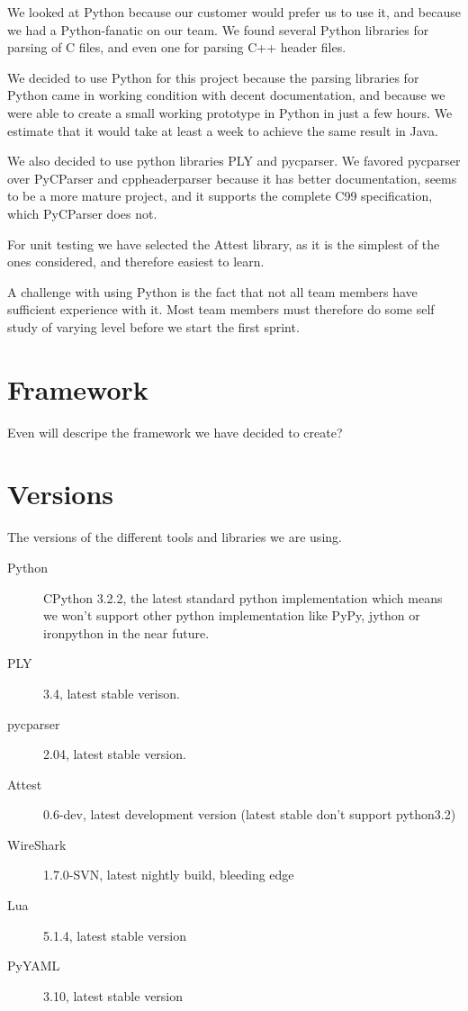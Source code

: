 We looked at Python because our customer would prefer us to use it, and because
we had a Python-fanatic on our team. We found several Python libraries for
parsing of C files, and even one for parsing C++ header files.

We decided to use Python for this project because the parsing libraries for
Python came in working condition with decent documentation, and because we
were able to create a small working prototype in Python in just a few hours.
We estimate that it would take at least a week to achieve the same result in
Java.

We also decided to use python libraries PLY and pycparser. We favored pycparser
over PyCParser and cppheaderparser because it has better documentation, seems
to be a more mature project, and it supports the complete C99 specification,
which PyCParser does not.

For unit testing we have selected the Attest library, as it is the simplest of
the ones considered, and therefore easiest to learn.

A challenge with using Python is the fact that not all team members have
sufficient experience with it. Most team members must therefore do some self
study of varying level before we start the first sprint.

\section{Framework}
Even will descripe the framework we have decided to create?

\section{Versions}

The versions of the different tools and libraries we are using.
\begin{description}
	\item[Python] CPython 3.2.2, the latest standard python implementation
		which means we won’t support other python implementation like PyPy,
		jython or ironpython in the near future.
	\item[PLY] 3.4, latest stable verison.
	\item[pycparser] 2.04, latest stable version.
	\item[Attest] 0.6-dev, latest development version (latest stable don’t
		support python3.2)
	\item[WireShark] 1.7.0-SVN, latest nightly build, bleeding edge
	\item[Lua] 5.1.4, latest stable version
	\item[PyYAML] 3.10, latest stable version
\end{description}

